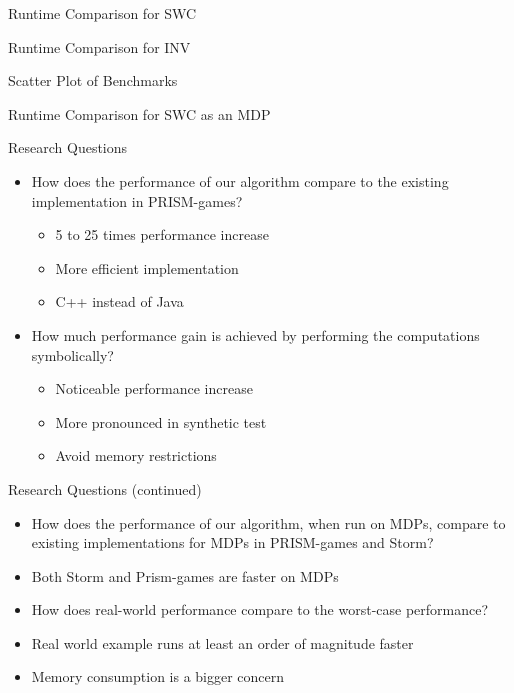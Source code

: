 \begin{frame}{Runtime Comparison for SWC}

\end{frame}
\begin{frame}{Runtime Comparison for INV}

\end{frame}
\begin{frame}{Scatter Plot of Benchmarks}

\end{frame}
\begin{frame}{Runtime Comparison for SWC as an MDP}

\end{frame}


\begin{frame}{Research Questions}
    \begin{itemize}[<+->]
    \item[\textbf{RQ1}:] How does the performance of our algorithm compare to the existing implementation in PRISM-games?
        \begin{itemize}[<+->]
            \item 5 to 25 times performance increase
            \item More efficient implementation
            \item C++ instead of Java
        \end{itemize}
    \item[\textbf{RQ2}:] How much performance gain is achieved by performing the computations symbolically?
        \begin{itemize}[<+->]
            \item Noticeable performance increase
            \item More pronounced in synthetic test
            \item Avoid memory restrictions
        \end{itemize}
\end{itemize}
\end{frame}

\begin{frame}{Research Questions (continued)}
    \begin{itemize}[<+->]
    \item[\textbf{RQ3}:] How does the performance of our algorithm, when run on MDPs, compare to existing implementations for MDPs in PRISM-games and Storm?
        \item Both Storm and Prism-games are faster on MDPs
    \item[\textbf{RQ4}:] How does real-world performance compare to the worst-case performance?
        \item Real world example runs at least an order of magnitude faster
        \item Memory consumption is a bigger concern
\end{itemize}
\end{frame}

